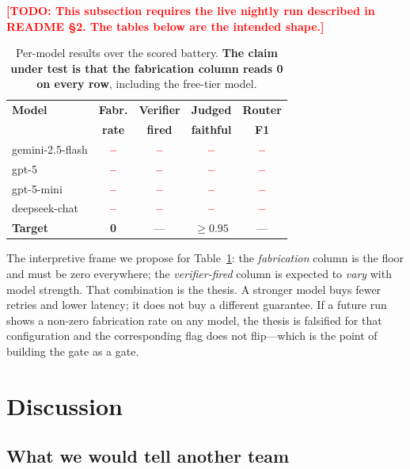 \documentclass[conference]{IEEEtran}
\newcommand{\TODO}[1]{\textcolor{red}{\textbf{[TODO: #1]}}}
\newcommand{\FILL}{\textcolor{red}{\textbf{--}}}
\begin{document}
\TODO{This subsection requires the live nightly run described in README \S2. The
tables below are the intended shape.}

\begin{table}[t]
\caption{Per-model results over the scored battery. \textbf{The claim under test
         is that the fabrication column reads 0 on every row}, including the
         free-tier model.}
\label{tab:permodel}
\centering
\footnotesize
\begin{tabular}{@{}lcccc@{}}
\toprule
\textbf{Model} & \textbf{Fabr.} & \textbf{Verifier} & \textbf{Judged} & \textbf{Router} \\
               & \textbf{rate}  & \textbf{fired}    & \textbf{faithful} & \textbf{F1} \\
\midrule
gemini-2.5-flash & \FILL & \FILL & \FILL & \FILL \\ %
gpt-5            & \FILL & \FILL & \FILL & \FILL \\ %
gpt-5-mini       & \FILL & \FILL & \FILL & \FILL \\ %
deepseek-chat    & \FILL & \FILL & \FILL & \FILL \\ %
\midrule
\textbf{Target}  & \textbf{0} & --- & $\geq 0.95$ & --- \\
\bottomrule
\end{tabular}
\end{table}

The interpretive frame we propose for Table~\ref{tab:permodel}: the
\emph{fabrication} column is the floor and must be zero everywhere; the
\emph{verifier-fired} column is expected to \emph{vary} with model strength. That
combination is the thesis. A stronger model buys fewer retries and lower latency;
it does not buy a different guarantee. If a future run shows a non-zero
fabrication rate on any model, the thesis is falsified for that configuration and
the corresponding flag does not flip---which is the point of building the gate as
a gate.

\section{Discussion}
\label{sec:discussion}

\subsection{What we would tell another team}
\end{document}
